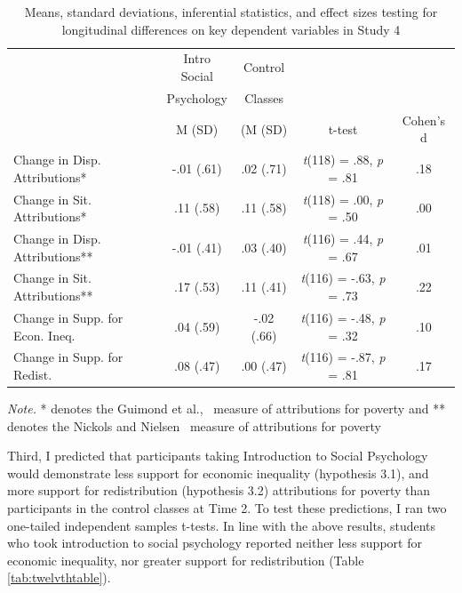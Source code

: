 \documentclass{sfuthesis}
\begin{document}
\begin{table}[h]
  \begin{center}
    \caption{Means, standard deviations, inferential statistics, and effect sizes testing for longitudinal differences on key dependent variables in Study 4}
    \label{tab:thirteenthtable}
    \begin{tabular}{l c c c c}
    \hline
      & \multicolumn{1}{c}{Intro Social} & \multicolumn{1}{c}{Control} & & \\
      & \multicolumn{1}{c}{Psychology} & \multicolumn{1}{c}{Classes} & & \\\cmidrule{2-3}
      & \multicolumn{1}{c}{M (SD)} & \multicolumn{1}{c}{(M (SD)} & t-test & Cohen's d\\
      \hline
      Change in Disp. Attributions* & \multicolumn{1}{c}{-.01 (.61)} & \multicolumn{1}{c}{.02 (.71)} & \multicolumn{1}{c}{\textit{t}(118) = .88, \textit{p} = .81} & .18\\
      Change in Sit. Attributions* & \multicolumn{1}{c}{.11 (.58)} & \multicolumn{1}{c}{.11 (.58)} & \multicolumn{1}{c}{\textit{t}(118) = .00, \textit{p} = .50} & .00\\
      Change in Disp. Attributions** & \multicolumn{1}{c}{-.01 (.41)} & \multicolumn{1}{c}{.03 (.40)} & \multicolumn{1}{c}{\textit{t}(116) = .44, \textit{p} = .67} & .01\\
      Change in Sit. Attributions** & \multicolumn{1}{c}{.17 (.53)} & \multicolumn{1}{c}{.11 (.41)} & \multicolumn{1}{c}{\textit{t}(116) = -.63, \textit{p} = .73} & .22\\
      Change in Supp. for Econ. Ineq. & \multicolumn{1}{c}{.04 (.59)} & \multicolumn{1}{c}{-.02 (.66)} & \multicolumn{1}{c}{\textit{t}(116) = -.48, \textit{p} = .32} & .10\\
      Change in Supp. for Redist. & \multicolumn{1}{c}{.08 (.47)} & \multicolumn{1}{c}{.00 (.47)} & \multicolumn{1}{c}{\textit{t}(116) = -.87, \textit{p} = .81} & .17\\
      \hline
    \end{tabular}
  \end{center}
  \textit{Note.} * denotes the Guimond et al.,~\cite{guimond89} measure of attributions for poverty and ** denotes the Nickols and Nielsen~\cite{nickols11} measure of attributions for poverty
\end{table}

Third, I predicted that participants taking Introduction to Social Psychology would demonstrate less support for economic inequality (hypothesis 3.1), and more support for redistribution (hypothesis 3.2) attributions for poverty than participants in the control classes at Time 2. To test these predictions, I ran two one-tailed independent samples t-tests. In line with the above results, students who took introduction to social psychology reported neither less support for economic inequality, nor greater support for redistribution (Table \ref{tab:twelvthtable}). 
\end{document}

